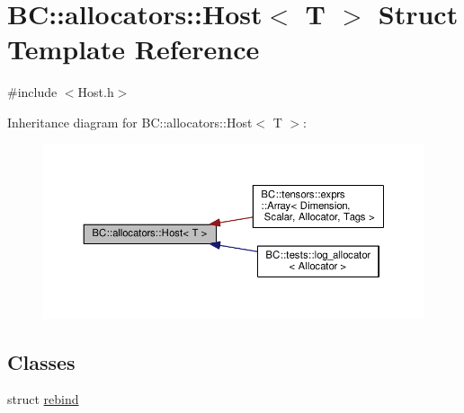 \hypertarget{structBC_1_1allocators_1_1Host}{}\section{BC\+:\+:allocators\+:\+:Host$<$ T $>$ Struct Template Reference}
\label{structBC_1_1allocators_1_1Host}


{\ttfamily \#include $<$Host.\+h$>$}



Inheritance diagram for BC\+:\+:allocators\+:\+:Host$<$ T $>$\+:
\nopagebreak
\begin{figure}[H]
\begin{center}
\leavevmode
\includegraphics[width=350pt]{structBC_1_1allocators_1_1Host__inherit__graph}
\end{center}
\end{figure}
\subsection*{Classes}
\begin{DoxyCompactItemize}
\item 
struct \hyperlink{structBC_1_1allocators_1_1Host_1_1rebind}{rebind}
\end{DoxyCompactItemize}
